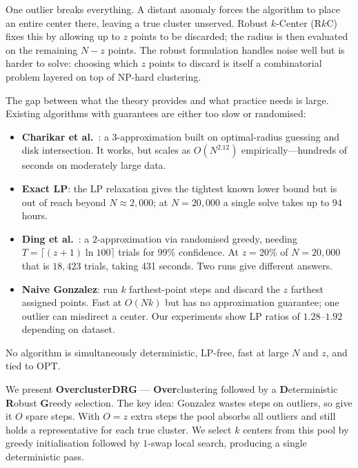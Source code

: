 \documentclass[twoside,leqno,twocolumn]{article}
\newcommand{\OPT}{\mathrm{OPT}}
\newcommand{\rkc}{R$k$C}
\begin{document}
One outlier breaks everything. A distant anomaly forces the algorithm
to place an entire center there, leaving a true cluster unserved.
Robust $k$-Center (\rkc) fixes this by allowing up to $z$ points to
be discarded; the radius is then evaluated on the remaining $N-z$
points. The robust formulation handles noise well but is harder to
solve: choosing which $z$ points to discard is itself a combinatorial
problem layered on top of NP-hard clustering.

The gap between what the theory provides and what practice needs is
large. Existing algorithms with guarantees are either too slow or
randomised:
\begin{itemize}[leftmargin=*]
  \item \textbf{Charikar et al.}~\cite{charikar2001}: a $3$-approximation
  built on optimal-radius guessing and disk intersection. It works, but
  scales as $O(N^{2.12})$ empirically---hundreds of seconds on
  moderately large data.
  \item \textbf{Exact LP}: the LP relaxation gives the tightest known
  lower bound but is out of reach beyond $N\approx2{,}000$; at
  $N=20{,}000$ a single solve takes up to 94 hours.
  \item \textbf{Ding et al.}~\cite{ding2019}: a $2$-approximation via
  randomised greedy, needing $T=\lceil(z{+}1)\ln100\rceil$ trials for
  99\% confidence. At $z=20\%$ of $N=20{,}000$ that is $18{,}423$
  trials, taking 431 seconds. Two runs give different answers.
  \item \textbf{Naive Gonzalez}: run $k$ farthest-point steps and
  discard the $z$ farthest assigned points. Fast at $O(Nk)$ but has no
  approximation guarantee; one outlier can misdirect a center. Our
  experiments show LP ratios of $1.28$--$1.92$ depending on dataset.
\end{itemize}

No algorithm is simultaneously deterministic, LP-free, fast at large
$N$ and $z$, and tied to $\OPT$.

We present \textbf{OverclusterDRG} --- \textbf{Over}clustering
followed by a \textbf{D}eterministic \textbf{R}obust \textbf{G}reedy
selection. The key idea: Gonzalez wastes steps on outliers, so give it
$O$ spare steps. With $O=z$ extra steps the pool absorbs all outliers
and still holds a representative for each true cluster. We select $k$
centers from this pool by greedy initialisation followed by $1$-swap
local search, producing a single deterministic pass.
\end{document}
